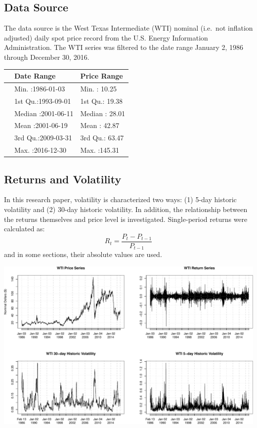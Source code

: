 \documentclass[11pt,]{article}
\makeatletter
\def\maxwidth{\ifdim\Gin@nat@width>\linewidth\linewidth
\else\Gin@nat@width\fi}
\let\Oldincludegraphics\includegraphics
\renewcommand{\includegraphics}[1]{\Oldincludegraphics[width=\maxwidth]{#1}}
\makeatother
\begin{document}
\subsection{Data Source}\label{data-source}

The data source is the West Texas Intermediate (WTI) nominal (i.e.~not
inflation adjusted) daily spot price record from the U.S. Energy
Information Administration. The WTI series was filtered to the date
range January 2, 1986 through December 30, 2016.

\begin{longtable}[]{@{}lll@{}}
\toprule
& Date Range & Price Range\tabularnewline
\midrule
\endhead
& Min. :1986-01-03 & Min. : 10.25\tabularnewline
& 1st Qu.:1993-09-01 & 1st Qu.: 19.38\tabularnewline
& Median :2001-06-11 & Median : 28.01\tabularnewline
& Mean :2001-06-19 & Mean : 42.87\tabularnewline
& 3rd Qu.:2009-03-31 & 3rd Qu.: 63.47\tabularnewline
& Max. :2016-12-30 & Max. :145.31\tabularnewline
\bottomrule
\end{longtable}

\subsection{Returns and Volatility}\label{returns-and-volatility}

In this research paper, volatility is characterized two ways: (1) 5-day
historic volatility and (2) 30-day historic volatility. In addition, the
relationship between the returns themselves and price level is
investigated. Single-period returns were calculated as:
\[R_t = \frac{P_t-P_{t-1}}{P_{t-1}}\] and in some sections, their
absolute values are used.

\includegraphics{Figs/unnamed-chunk-4-1.pdf}
\end{document}
